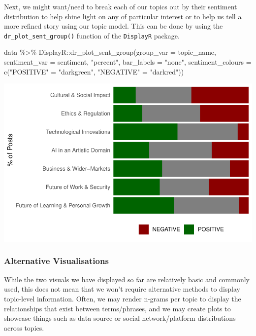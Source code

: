 \documentclass[
  letterpaper,
  DIV=11,
  numbers=noendperiod]{scrreprt}
\newenvironment{Shaded}{\begin{snugshade}}{\end{snugshade}}
\newcommand{\AttributeTok}[1]{\textcolor[rgb]{0.40,0.45,0.13}{#1}}
\newcommand{\FunctionTok}[1]{\textcolor[rgb]{0.28,0.35,0.67}{#1}}
\newcommand{\NormalTok}[1]{\textcolor[rgb]{0.00,0.23,0.31}{#1}}
\newcommand{\OtherTok}[1]{\textcolor[rgb]{0.00,0.23,0.31}{#1}}
\newcommand{\SpecialCharTok}[1]{\textcolor[rgb]{0.37,0.37,0.37}{#1}}
\newcommand{\StringTok}[1]{\textcolor[rgb]{0.13,0.47,0.30}{#1}}
\begin{document}
Next, we might want/need to break each of our topics out by their
sentiment distribution to help shine light on any of particular interest
or to help us tell a more refined story using our topic model. This can
be done by using the \texttt{dr\_plot\_sent\_group()} function of the
\texttt{DisplayR} package.

\begin{Shaded}
\begin{Highlighting}[]
\NormalTok{data }\SpecialCharTok{\%\textgreater{}\%} 
\NormalTok{  DisplayR}\SpecialCharTok{::}\FunctionTok{dr\_plot\_sent\_group}\NormalTok{(}\AttributeTok{group\_var =}\NormalTok{ topic\_name,}
                               \AttributeTok{sentiment\_var =}\NormalTok{ sentiment,}
                               \StringTok{"percent"}\NormalTok{, }\AttributeTok{bar\_labels =} \StringTok{"none"}\NormalTok{, }
                               \AttributeTok{sentiment\_colours =} \FunctionTok{c}\NormalTok{(}\StringTok{"POSITIVE"} \OtherTok{=} \StringTok{"darkgreen"}\NormalTok{,}
                                                     \StringTok{"NEGATIVE"} \OtherTok{=} \StringTok{"darkred"}\NormalTok{))}
\end{Highlighting}
\end{Shaded}

\includegraphics{conversation_landscape_files/figure-pdf/unnamed-chunk-8-1.pdf}

\subsubsection{Alternative
Visualisations}\label{alternative-visualisations}

While the two visuals we have displayed so far are relatively basic and
commonly used, this does not mean that we won't require alternative
methods to display topic-level information. Often, we may render n-grams
per topic to display the relationships that exist between terms/phrases,
and we may create plots to showcase things such as data source or social
network/platform distributions across topics.
\end{document}
